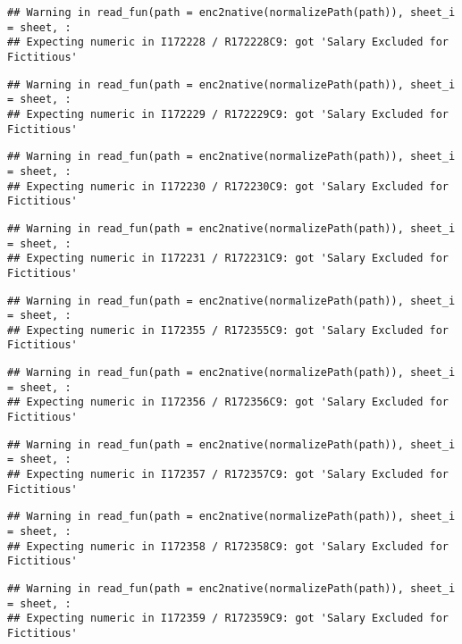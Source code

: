 \documentclass[
]{article}
\begin{document}
\begin{verbatim}
## Warning in read_fun(path = enc2native(normalizePath(path)), sheet_i = sheet, :
## Expecting numeric in I172228 / R172228C9: got 'Salary Excluded for Fictitious'
\end{verbatim}

\begin{verbatim}
## Warning in read_fun(path = enc2native(normalizePath(path)), sheet_i = sheet, :
## Expecting numeric in I172229 / R172229C9: got 'Salary Excluded for Fictitious'
\end{verbatim}

\begin{verbatim}
## Warning in read_fun(path = enc2native(normalizePath(path)), sheet_i = sheet, :
## Expecting numeric in I172230 / R172230C9: got 'Salary Excluded for Fictitious'
\end{verbatim}

\begin{verbatim}
## Warning in read_fun(path = enc2native(normalizePath(path)), sheet_i = sheet, :
## Expecting numeric in I172231 / R172231C9: got 'Salary Excluded for Fictitious'
\end{verbatim}

\begin{verbatim}
## Warning in read_fun(path = enc2native(normalizePath(path)), sheet_i = sheet, :
## Expecting numeric in I172355 / R172355C9: got 'Salary Excluded for Fictitious'
\end{verbatim}

\begin{verbatim}
## Warning in read_fun(path = enc2native(normalizePath(path)), sheet_i = sheet, :
## Expecting numeric in I172356 / R172356C9: got 'Salary Excluded for Fictitious'
\end{verbatim}

\begin{verbatim}
## Warning in read_fun(path = enc2native(normalizePath(path)), sheet_i = sheet, :
## Expecting numeric in I172357 / R172357C9: got 'Salary Excluded for Fictitious'
\end{verbatim}

\begin{verbatim}
## Warning in read_fun(path = enc2native(normalizePath(path)), sheet_i = sheet, :
## Expecting numeric in I172358 / R172358C9: got 'Salary Excluded for Fictitious'
\end{verbatim}

\begin{verbatim}
## Warning in read_fun(path = enc2native(normalizePath(path)), sheet_i = sheet, :
## Expecting numeric in I172359 / R172359C9: got 'Salary Excluded for Fictitious'
\end{verbatim}
\end{document}
